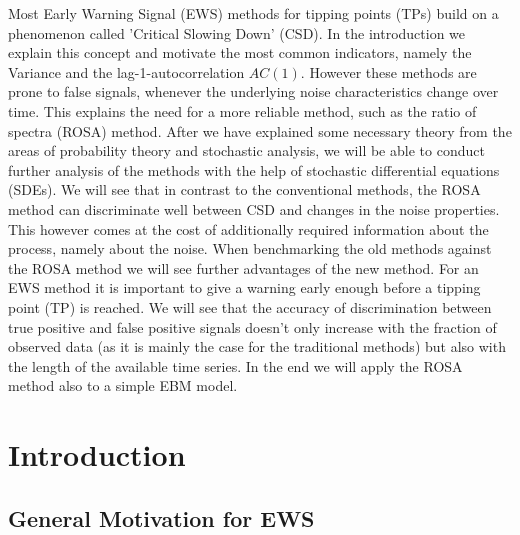 \documentclass[%
thesis=student,%
coverpage=false,%
titlepage=false,%
headmarks=true, %
english,%
font=libertine, %
math=newpxtx, %
BCOR=5mm,%
coverBCOR=11mm%
]{tumbook}
\begin{document}
Most Early Warning Signal (EWS) methods for tipping points (TPs) build on a phenomenon called 'Critical Slowing Down' (CSD). In the introduction we explain this concept and motivate the most common indicators, namely the Variance and the lag-1-autocorrelation $AC(1)$. However these methods are prone to false signals, whenever the underlying noise characteristics change over time. This explains the need for a more reliable method, such as the ratio of spectra (ROSA) method. After we have explained some necessary theory from the areas of probability theory and stochastic analysis, we will be able to conduct further analysis of the methods with the help of stochastic differential equations (SDEs).
We will see that in contrast to the conventional methods, the ROSA method can discriminate well between CSD and changes in the noise properties. This however comes at the cost of additionally required information about the process, namely about the noise. When benchmarking the old methods against the ROSA method we will see further advantages of the new method. For an EWS method it is important to give a warning early enough before a tipping point (TP) is reached. We will see that the accuracy of discrimination between true positive and false positive signals doesn't only increase with the fraction of observed data (as it is mainly the case for the traditional methods) but also with the length of the available time series. In the end we will apply the ROSA method also to a simple EBM model.



\cleardoublepage{}

\tableofcontents

\mainmatter{}
\chapter{Introduction}

\section{General Motivation for EWS}%
\label{sec:General  Motivation for EWS}
\end{document}
